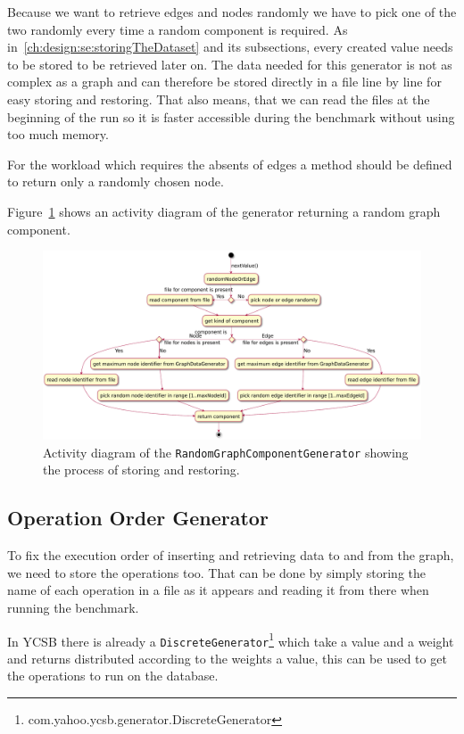 Because we want to retrieve edges and nodes randomly we have to pick one of the two randomly every time a random component is required.
As in~\ref{ch:design:se:storingTheDataset} and its subsections,
every created value needs to be stored to be retrieved later on.
The data needed for this generator is not as complex as a graph and can therefore be stored directly in a file line by line for easy storing and restoring.
That also means,
that we can read the files at the beginning of the run so it is faster accessible during the benchmark without using too much memory.

For the workload which requires the absents of edges a method should be defined to return only a randomly chosen node.

Figure~\ref{fig:randomGraphComponentGenerator} shows an activity diagram of the generator returning a random graph component.

\begin{figure}
  \includegraphics[width=\textwidth]{images/extensions/randomGraphComponentGenerator}
  \caption{Activity diagram of the \texttt{RandomGraphComponentGenerator} showing the process of storing and restoring.}
  \label{fig:randomGraphComponentGenerator}
\end{figure}

\subsection{Operation Order Generator}
\label{ch:design:se:operationOrderGenerator}
To fix the execution order of inserting and retrieving data to and from the graph,
we need to store the operations too.
That can be done by simply storing the name of each operation in a file as it appears and reading it from there when running the benchmark.

In YCSB there is already a \texttt{DiscreteGenerator}\footnote{com.yahoo.ycsb.generator.DiscreteGenerator} which take a value and a weight and returns distributed according to the weights a value,
this can be used to get the operations to run on the database.

